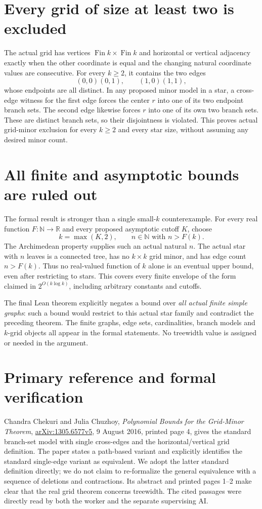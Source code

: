 \documentclass[11pt]{article}
\begin{document}
\section{Every grid of size at least two is excluded}
The actual grid has vertices
$\operatorname{Fin}k\times\operatorname{Fin}k$ and horizontal
or vertical adjacency exactly when the other coordinate is equal
and the changing natural coordinate values are consecutive.
For every $k\geq2$, it contains the two edges
\[
 (0,0)(0,1),\qquad (1,0)(1,1),
\]
whose endpoints are all distinct. In any proposed minor model
in a star, a cross-edge witness for the first edge forces the
center $r$ into one of its two endpoint branch sets. The second
edge likewise forces $r$ into one of its own two branch sets.
These are distinct branch sets, so their disjointness is violated.
This proves actual grid-minor exclusion for every $k\geq2$ and
every star size, without assuming any desired minor count.

\newpage
\section{All finite and asymptotic bounds are ruled out}
The formal result is stronger than a single small-$k$
counterexample. For every real function $F:\mathbb N\to\mathbb R$
and every proposed asymptotic cutoff $K$, choose
\[
 k=\max(K,2),\qquad n\in\mathbb N\text{ with }n>F(k).
\]
The Archimedean property supplies such an actual natural $n$.
The actual star with $n$ leaves is a connected tree, has no
$k\times k$ grid minor, and has edge count $n>F(k)$.
Thus no real-valued function of $k$ alone is an eventual upper
bound, even after restricting to stars. This covers every finite
envelope of the form claimed in $2^{O(k\log k)}$, including
arbitrary constants and cutoffs.

The final Lean theorem explicitly negates a bound over
\emph{all actual finite simple graphs}: such a bound would
restrict to this actual star family and contradict the preceding
theorem. The finite graphs, edge sets, cardinalities, branch
models and $k$-grid objects all appear in the formal statements.
No treewidth value is assigned or needed in the argument.

\section{Primary reference and formal verification}
Chandra Chekuri and Julia Chuzhoy,
\emph{Polynomial Bounds for the Grid-Minor Theorem},
\href{https://arxiv.org/pdf/1305.6577v5}{arXiv:1305.6577v5},
9 August 2016, printed page 4, gives the standard branch-set
model with single cross-edges and the horizontal/vertical grid
definition. The paper states a path-based variant and explicitly
identifies the standard single-edge variant as equivalent.
We adopt the latter standard definition directly; we do not claim
to re-formalize the general equivalence with a sequence of
deletions and contractions. Its abstract and printed pages 1--2
make clear that the real grid theorem concerns treewidth.
The cited passages were directly read by both the worker and
the separate supervising AI.
\end{document}
